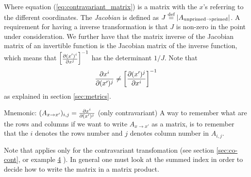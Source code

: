 \documentclass[a4paper, 12pt]{article}
\begin{document}
%
Where equation (\ref{eq:contravariant_matrix}) is a matrix with the $x$'s
referring to the different coordinates. The \emph{Jacobian} is
defined as $J\overset{\text{def}}{=}|A_{\text{unprimed}\to \text{primed}}|$. A requirement for
having a inverse transformation is that $J$ is non-zero in the point under
consideration. We further have that the matrix inverse of the Jacobian matrix
of an invertible function is the Jacobian matrix of the inverse function, which
means that
%
$\begin{bmatrix}
 \frac{\partial {(x')^i}}{\partial{x^j}}
\end{bmatrix}^{-1}$
has the determinant $1/J$. Note that
%
\begin{align*}
 \frac{\partial {x^i}}{\partial{(x')^j}} \neq \left[\frac{\partial {(x')^j}}{\partial{x^i}}\right]^{-1}
\end{align*}
%
as explained in section \ref{sec:metrics}.

\vspace{0.5cm}
\begin{greenbox}{Mnemonic: $(A_{x \to x'})_{i,j} = \frac{\partial {x^i}}{\partial{(x')^j}}$ (only
contravariant)}
 A way to remember what are the rows and columns if we want to write $A_{x \to
 x'}$ as a matrix, is to remember that the $i$ denotes the rows number and
 $j$ denotes column number in $A_{i,j}$.

 Note that applies only for the contravariant transfomation (see section
\ref{sec:co-cont}, or example \hyperref[ex:fmt]{4} ). In general one must look
at the summed index in order to decide how to write the matrix in a matrix
product.
\end{greenbox}
\end{document}
